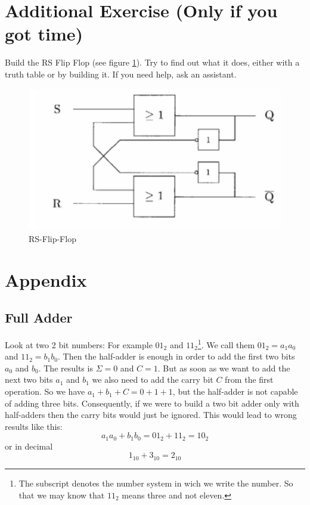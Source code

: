 \documentclass[10pt,a4paper]{article}
\begin{document}
\section{Additional Exercise (Only if you got time)}
Build the RS Flip Flop (see figure \ref{fig:RSFF}). Try to find out what it does, either with a truth table or by building it. If you need help, ask an assistant.

\begin{figure}[H]
	\centering
	\includegraphics[height=0.35\textwidth]{RSFF}%
	\caption{RS-Flip-Flop}%
	\label{fig:RSFF}
\end{figure}

\section{Appendix}
\subsection{Full Adder}\label{subsec:appendix-full-adder}

Look at two 2 bit numbers: For example $01_2$ and $11_2$\footnote{The subscript denotes the number system in wich we write the number. So that we may know that $11_2$ means three and not eleven.}.  We call them $01_2 = a_1a_0$ and $11_2 = b_1b_0$. Then the half-adder is enough in order to add the first two bits $a_0$ and $b_0$. The results is $\Sigma=0$ and $C=1$. But as soon as we want to add the next two bits $a_1$ and $b_1$ we also need to add the carry bit $C$ from the first operation. So we have $a_1+b_1+C = 0 + 1 + 1$, but the half-adder is not capable of adding three bits. Consequently, if we were to build a two bit adder only with half-adders then the carry bits would just be ignored. This would lead to wrong results like this:
\[
a_1a_0 + b_1b_0 = 01_2 + 11_2 = 10_2
\]
or in decimal
\[
1_{10} + 3_{10} = 2_{10}
\]
\end{document}
